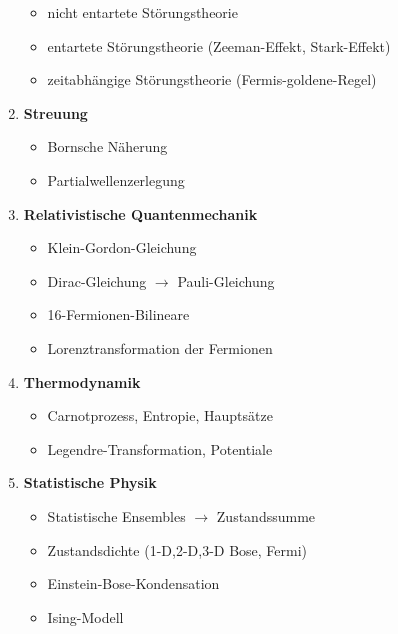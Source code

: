 \begin{enumerate}
  \begin{itemize}
  \item nicht entartete Störungstheorie
   \item entartete Störungstheorie (Zeeman-Effekt, Stark-Effekt)
   \item zeitabhängige Störungstheorie (Fermis-goldene-Regel)
  \end{itemize}

\item \textbf{Streuung}

  \begin{itemize}
  \item Bornsche Näherung
   \item Partialwellenzerlegung
  \end{itemize}

\item \textbf{Relativistische Quantenmechanik}

  \begin{itemize}
  \item Klein-Gordon-Gleichung
   \item Dirac-Gleichung \(\rightarrow \) Pauli-Gleichung
   \item 16-Fermionen-Bilineare
   \item Lorenztransformation der Fermionen
  \end{itemize}

\item \textbf{Thermodynamik}

  \begin{itemize} 
   \item Carnotprozess, Entropie, Hauptsätze
   \item Legendre-Transformation, Potentiale
  \end{itemize}

\item \textbf{Statistische Physik}

  \begin{itemize}
  \item Statistische Ensembles \(\rightarrow \) Zustandssumme
   \item Zustandsdichte (1-D,2-D,3-D Bose, Fermi)
   \item Einstein-Bose-Kondensation
   \item Ising-Modell
  \end{itemize}


\end{enumerate}



